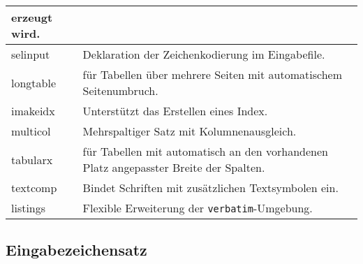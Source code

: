 \begin{longtable}[c]{@{}>{\raggedright\arraybackslash\ttfamily}p{2.2cm}p{}@{}}
  erzeugt wird.\\\midrule
selinput & Deklaration der Zeichenkodierung im
  Eingabefile.\\\midrule
longtable &   für Tabellen über mehrere Seiten mit automatischem Seitenumbruch.\\\midrule
imakeidx & Unterstützt das Erstellen eines Index.\\\midrule
multicol & Mehrspaltiger Satz mit Kolumnenausgleich.\\\midrule
tabularx & für Tabellen mit automatisch an den vorhandenen Platz angepasster Breite der Spalten. \\\midrule
textcomp & Bindet Schriften mit zusätzlichen Textsymbolen ein.\\\midrule
listings & Flexible Erweiterung der \texttt{verbatim}-Umgebung.\\
\end{longtable}


\subsection{Eingabezeichensatz}\label{inputenc}


